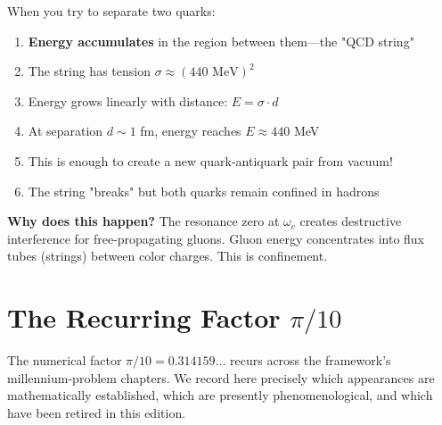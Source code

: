 \begin{intuitive}
When you try to separate two quarks:

\begin{enumerate}
\item \textbf{Energy accumulates} in the region between them—the "QCD string"

\item The string has tension $\sigma \approx (440 \text{ MeV})^2$

\item Energy grows linearly with distance: $E = \sigma \cdot d$

\item At separation $d \sim 1$ fm, energy reaches $E \approx 440$ MeV

\item This is enough to create a new quark-antiquark pair from vacuum!

\item The string "breaks" but both quarks remain confined in hadrons
\end{enumerate}

\textbf{Why does this happen?} The resonance zero at $\omega_c$ creates destructive interference for free-propagating gluons. Gluon energy concentrates into flux tubes (strings) between color charges. This is confinement.
\end{intuitive}

\section{The Recurring Factor $\pi/10$}\label{sec:pi-over-10-ym}

The numerical factor $\pi/10 = 0.314159\ldots$ recurs across the framework's millennium-problem chapters. We record here precisely which appearances are mathematically established, which are presently phenomenological, and which have been retired in this edition.

